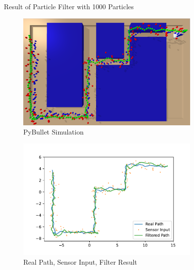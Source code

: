 \documentclass[conference,onecolumn]{IEEEtran}
\begin{document}
\begin{figure}[H]
   \smallskip\hrulefill \smallskip
   
  Result of Particle Filter with 1000 Particles
  \medskip

  \begin{subfigure}[t]{.3\linewidth}
    \centering\includegraphics[width=\linewidth]{Figs/p1000.png}
    \caption{PyBullet Simulation}
  \end{subfigure}
  \begin{subfigure}[t]{.3\linewidth}
    \centering\includegraphics[width=\linewidth]{Figs/Particle Filter + 1000Path.pdf}
    \caption{Real Path, Sensor Input, Filter Result}
  \end{subfigure}
  \begin{subfigure}[t]{.3\linewidth}

\end{subfigure}
\end{figure}
\end{document}
